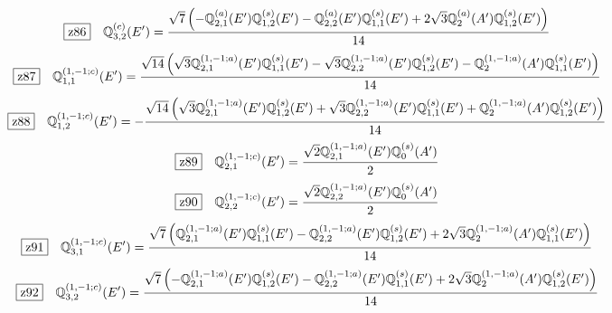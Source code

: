 \documentclass[fleqn,10pt,landscape]{jsarticle}
\begin{document}
\begin{dmath*}
\hspace*{3mm}\fbox{z86}\quad \mathbb{Q}_{3,2}^{(c)}(E^{\prime})=\frac{\sqrt{7} \left(- \mathbb{Q}_{2,1}^{(a)}(E^{\prime}) \mathbb{Q}_{1,2}^{(s)}(E^{\prime}) - \mathbb{Q}_{2,2}^{(a)}(E^{\prime}) \mathbb{Q}_{1,1}^{(s)}(E^{\prime}) + 2 \sqrt{3} \mathbb{Q}_{2}^{(a)}(A^{\prime}) \mathbb{Q}_{1,2}^{(s)}(E^{\prime})\right)}{14}
\end{dmath*}
\begin{dmath*}
\hspace*{3mm}\fbox{z87}\quad \mathbb{Q}_{1,1}^{(1,-1;c)}(E^{\prime})=\frac{\sqrt{14} \left(\sqrt{3} \mathbb{Q}_{2,1}^{(1,-1;a)}(E^{\prime}) \mathbb{Q}_{1,1}^{(s)}(E^{\prime}) - \sqrt{3} \mathbb{Q}_{2,2}^{(1,-1;a)}(E^{\prime}) \mathbb{Q}_{1,2}^{(s)}(E^{\prime}) - \mathbb{Q}_{2}^{(1,-1;a)}(A^{\prime}) \mathbb{Q}_{1,1}^{(s)}(E^{\prime})\right)}{14}
\end{dmath*}
\begin{dmath*}
\hspace*{3mm}\fbox{z88}\quad \mathbb{Q}_{1,2}^{(1,-1;c)}(E^{\prime})=- \frac{\sqrt{14} \left(\sqrt{3} \mathbb{Q}_{2,1}^{(1,-1;a)}(E^{\prime}) \mathbb{Q}_{1,2}^{(s)}(E^{\prime}) + \sqrt{3} \mathbb{Q}_{2,2}^{(1,-1;a)}(E^{\prime}) \mathbb{Q}_{1,1}^{(s)}(E^{\prime}) + \mathbb{Q}_{2}^{(1,-1;a)}(A^{\prime}) \mathbb{Q}_{1,2}^{(s)}(E^{\prime})\right)}{14}
\end{dmath*}
\begin{dmath*}
\hspace*{3mm}\fbox{z89}\quad \mathbb{Q}_{2,1}^{(1,-1;c)}(E^{\prime})=\frac{\sqrt{2} \mathbb{Q}_{2,1}^{(1,-1;a)}(E^{\prime}) \mathbb{Q}_{0}^{(s)}(A^{\prime})}{2}
\end{dmath*}
\begin{dmath*}
\hspace*{3mm}\fbox{z90}\quad \mathbb{Q}_{2,2}^{(1,-1;c)}(E^{\prime})=\frac{\sqrt{2} \mathbb{Q}_{2,2}^{(1,-1;a)}(E^{\prime}) \mathbb{Q}_{0}^{(s)}(A^{\prime})}{2}
\end{dmath*}
\begin{dmath*}
\hspace*{3mm}\fbox{z91}\quad \mathbb{Q}_{3,1}^{(1,-1;c)}(E^{\prime})=\frac{\sqrt{7} \left(\mathbb{Q}_{2,1}^{(1,-1;a)}(E^{\prime}) \mathbb{Q}_{1,1}^{(s)}(E^{\prime}) - \mathbb{Q}_{2,2}^{(1,-1;a)}(E^{\prime}) \mathbb{Q}_{1,2}^{(s)}(E^{\prime}) + 2 \sqrt{3} \mathbb{Q}_{2}^{(1,-1;a)}(A^{\prime}) \mathbb{Q}_{1,1}^{(s)}(E^{\prime})\right)}{14}
\end{dmath*}
\begin{dmath*}
\hspace*{3mm}\fbox{z92}\quad \mathbb{Q}_{3,2}^{(1,-1;c)}(E^{\prime})=\frac{\sqrt{7} \left(- \mathbb{Q}_{2,1}^{(1,-1;a)}(E^{\prime}) \mathbb{Q}_{1,2}^{(s)}(E^{\prime}) - \mathbb{Q}_{2,2}^{(1,-1;a)}(E^{\prime}) \mathbb{Q}_{1,1}^{(s)}(E^{\prime}) + 2 \sqrt{3} \mathbb{Q}_{2}^{(1,-1;a)}(A^{\prime}) \mathbb{Q}_{1,2}^{(s)}(E^{\prime})\right)}{14}
\end{dmath*}
\end{document}
